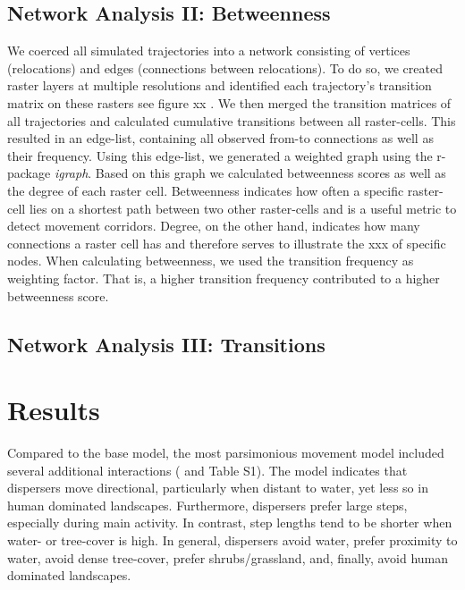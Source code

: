 \documentclass[abstract=on,10pt,a4paper,bibliography=totocnumbered]{article}
\begin{document}
\subsection{Network Analysis II: Betweenness}
We coerced all simulated trajectories into a network consisting of vertices
(relocations) and edges (connections between relocations). To do so, we created
raster layers at multiple resolutions and identified each trajectory's
transition matrix on these rasters see figure xx \citep{Bastille.2018}. We then
merged the transition matrices of all trajectories and calculated cumulative
transitions between all raster-cells. This resulted in an edge-list, containing
all observed from-to connections as well as their frequency. Using this
edge-list, we generated a weighted graph using the r-package \textit{igraph}.
Based on this graph we calculated betweenness scores as well as the degree of
each raster cell. Betweenness indicates how often a specific raster-cell lies on
a shortest path between two other raster-cells and is a useful metric to detect
movement corridors. Degree, on the other hand, indicates how many connections a
raster cell has and therefore serves to illustrate the xxx of specific nodes.
When calculating betweenness, we used the transition frequency as weighting
factor. That is, a higher transition frequency contributed to a higher
betweenness score.

\subsection{Network Analysis III: Transitions}



\section{Results}
Compared to the base model, the most parsimonious movement model included
several additional interactions ( and Table S1). The model
indicates that dispersers move directional, particularly when distant to water,
yet less so in human dominated landscapes. Furthermore, dispersers prefer large
steps, especially during main activity. In contrast, step lengths tend to be
shorter when water- or tree-cover is high. In general, dispersers avoid water,
prefer proximity to water, avoid dense tree-cover, prefer shrubs/grassland, and,
finally, avoid human dominated landscapes.
\end{document}

